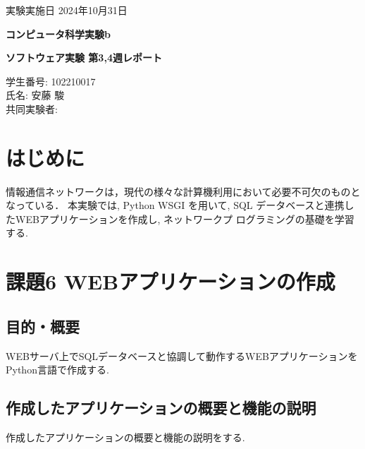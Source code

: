\documentclass{ltjsarticle} %
\begin{document}
\thispagestyle{empty}
\begin{flushright}
{\large 実験実施日 2024年10月31日{\hspace{5cm}}} 
\end{flushright}

\vspace*{\fill}
\centering
{\Huge\bf コンピュータ科学実験b}
\vspace*{1cm}

{\huge\bf ソフトウェア実験 第3,4週レポート}
\vspace*{\fill}

\vspace*{\fill}

\vspace*{\fill}

\begin{flushright}
{\large 学生番号: 102210017} \\ %
{\large 氏名: 安藤 駿} \\

{\large 共同実験者:} \\
\end{flushright}

\clearpage

\addtocounter{page}{-1}
\raggedright
\setlength{\parindent}{1em}

\section{はじめに}
情報通信ネットワークは，現代の様々な計算機利用において必要不可欠のものとなっている．
本実験では, Python WSGI を用いて, SQL データベースと連携したWEBアプリケーションを作成し, ネットワークプ
ログラミングの基礎を学習する. 


\section{課題6 WEBアプリケーションの作成}

\subsection{目的・概要}
WEBサーバ上でSQLデータベースと協調して動作するWEBアプリケーションをPython言語で作成する. 

\subsection{作成したアプリケーションの概要と機能の説明}
作成したアプリケーションの概要と機能の説明をする. 
\end{document}
